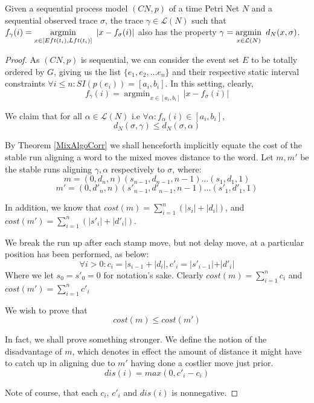 \documentclass[runningheads]{llncs}
\DeclareMathOperator*{\argmin}{argmin}
\begin{document}
\begin{theorem*}
	Given a sequential process model $(CN, p)$ of a time Petri Net $N$ and a sequential observed trace $\sigma$, the trace $\gamma \in \mathcal{L}(N)$ such that $f_{\gamma}(i)= \underset{x \in [Eft(t_i), Lft(t_i)]} {\argmin}\hspace{0.5em} {|x - f_\sigma(i)|}$ also has the property $\gamma = \underset{x \in \mathcal{L}(N)}{\argmin} \hspace{0.5em}{d_N(x, \sigma)}$. 
\end{theorem*}
\begin{proof}
As $(CN, p)$ is sequential, we can consider the event set $E$ to be totally ordered by $G$, giving us the list $\{e_1, e_2, \dots e_n\}$ and their respective static interval constraints $\forall i \leq n : SI(p(e_i)) = [a_i, b_i]$. In this setting, clearly, $$f_{\gamma}(i)= \argmin_{x \in [a_i, b_i]} {|x - f_\sigma(i)|}$$

We claim that for all $\alpha \in \mathcal{L}(N)$ i.e $\forall \alpha : f_{\alpha}(i) \in [a_i, b_i]$, $$d_N(\sigma, \gamma) \leq d_N(\sigma, \alpha)$$

By Theorem \ref{MixAlgoCorr} we shall henceforth implicitly equate the cost of the stable run aligning a word to the mixed moves distance to the word. 
Let $m, m'$ be the stable runs aligning $\gamma, \alpha$ respectively to $\sigma$, where: 
$$m = (0, d_n, n)(s_{n-1}, d_{n-1}, n-1) \dots (s_1, d_1, 1)$$  
$$m' = (0, d'_n, n)(s'_{n-1}, d'_{n-1}, n-1) \dots (s'_1, d'_1, 1)$$ 

In addition, we know that $cost(m) = \sum_{i = 1}^{n} (|s_i| + |d_i|)$, and $cost(m') = \sum_{i = 1}^{n} (|s'_i| + |d'_i|)$. 

We break the run up after each stamp move, but not delay move, at a particular position has been performed, as below: $$\forall i > 0 : c_i = |s_{i-1} + |d_i|, c'_i = |s'_{i-1}| + |d'_i|$$ Where we let $s_0 = s'_0 = 0$ for notation's sake. Clearly $cost(m) = \sum_{i = 1}^{n} c_i$ and $cost(m') = \sum_{i = 1}^{n} c'_i$

We wish to prove that $$cost(m) \leq cost(m')$$ 

In fact, we shall prove something stronger. We define the notion of the disadvantage of $m$, which denotes in effect the amount of distance it might have to catch up in aligning due to $m'$ having done a costlier move just prior. $$dis(i) = max(0, c'_i - c_i)$$

Note of course, that each $c_i$, $c'_i$ and $dis(i)$ is nonnegative. 


\end{proof}
\end{document}
